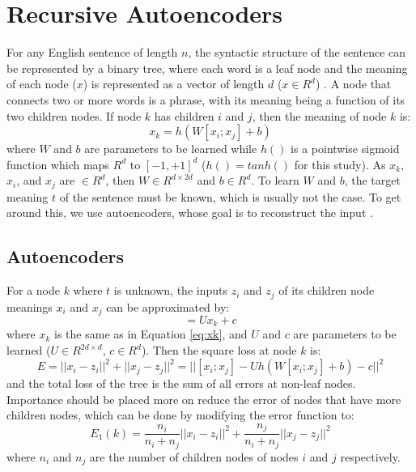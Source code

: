 \documentclass{article}
\begin{document}
\section{Recursive Autoencoders}
For any English sentence of length $n$, the syntactic structure of the sentence can be represented by a binary tree, where each word is a leaf node and the meaning of each node ($x$) is represented as a vector of length $d$ ($x \in R^d$) \cite{CSE250B}. A node that connects two or more words is a phrase, with its meaning being a function of its two children nodes. If node $k$ has children $i$ and $j$, then the meaning of node $k$ is:
\begin{equation}
    x_k = h(W[x_i ; x_j] + b)
    \label{eq:xk}
\end{equation}
where $W$ and $b$ are parameters to be learned while $h()$ is a pointwise sigmoid function which maps $R^d$ to $[-1, +1]^d$ ($h() = tanh()$ for this study). As $x_k$, $x_i$, and $x_j$ are $\in R^d$, then $W \in R^{d \times 2d}$ and $b \in R^d$. To learn $W$ and $b$, the target meaning $t$ of the sentence must be known, which is usually not the case. To get around this, we use autoencoders, whose goal is to reconstruct the input \cite{CSE250B}.


%
%
\subsection{Autoencoders}
For a node $k$ where $t$ is unknown, the inputs $z_i$ and $z_j$ of its children node meanings $x_i$ and $x_j$ can be approximated by:
\begin{equation}
    [z_i ; z_j] = U x_k + c
\end{equation}
where $x_k$ is the same as in Equation \ref{eq:xk}, and $U$ and $c$ are parameters to be learned ($U \in R^{2d \times d}$, $c \in R^d$). Then the square loss at node $k$ is:
\begin{equation}
    E = ||x_i - z_i||^2 + ||x_j - z_j||^2 = || [x_i;x_j] - U h(W[x_i; x_j] + b) - c||^2
\end{equation}
and the total loss of the tree is the sum of all errors at non-leaf nodes. Importance should be placed more on reduce the error of nodes that have more children nodes, which can be done by modifying the error function to:
\begin{equation}
    E_1 (k) = \frac{n_i}{n_i + n_j} ||x_i - z_i||^2 + \frac{n_j}{n_i + n_j} ||x_j - z_j||^2
\end{equation}
where $n_i$ and $n_j$ are the number of children nodes of nodes $i$ and $j$ respectively.
\end{document}
